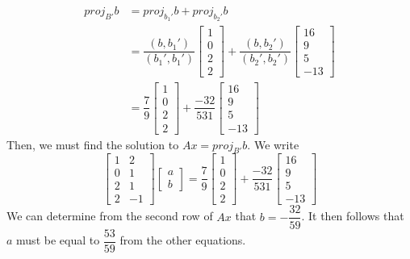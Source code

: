 \documentclass{article}
\begin{document}
\begin{align*}
proj_{B'}b & = proj_{b_1'}b +proj_{b_2'}b \\
& = \dfrac{(b,b_1')}{(b_1',b_1')}\begin{bmatrix}1\\0\\2\\2\end{bmatrix} + \dfrac{(b,b_2')}{(b_2',b_2')}
\begin{bmatrix}16\\9\\5\\-13\end{bmatrix}\\
& = \dfrac{7}{9}\begin{bmatrix}1\\0\\2\\2\end{bmatrix} + \dfrac{-32}{531}\begin{bmatrix}16\\9\\5\\-13\end{bmatrix}
\end{align*}
Then, we must find the solution to $Ax = proj_{B'}b$. We write
\[ \begin{bmatrix}1&2\\0&1\\2&1\\2&-1\end{bmatrix}\begin{bmatrix}a\\b\end{bmatrix} = \dfrac{7}{9}\begin{bmatrix}1\\0\\2\\2\end{bmatrix} + \dfrac{-32}{531}\begin{bmatrix}16\\9\\5\\-13\end{bmatrix}\]
We can determine from the second row of $Ax$ that $b = -\dfrac{32}{59}$. It then follows that $a$ must be equal to $\dfrac{53}{59}$ from the other equations. 
\end{document}
